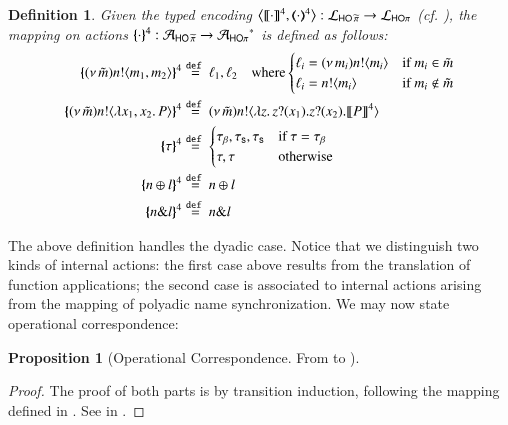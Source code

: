\documentclass[preprint,11pt]{elsarticle}
\newtheorem{definition}{Definition}[section]
\newtheorem{proposition}{Proposition}[section]
\begin{document}
{\begin{definition}
\label{d:actmap4}
Given the typed encoding
	$\big\langle \llbracket\cdot\rrbracket^4, (\!\!\langle\cdot\rangle\!\!)^{4}\big\rangle: \mathcal{L}_{\mathsf{HO}\,{\widetilde{\pi}}} \to \mathcal{L}_{\mathsf{HO}\pi}$ (cf. ), 
	the mapping on actions 
$\{\!\!\{\cdot\}\!\!\}^{4}: \mathcal{A}_{\mathsf{HO}\,{\widetilde{\pi}}} \to  {\mathcal{A}_{\ensuremath{\mathsf{HO}\pi}}}^*$
is defined as follows:
	\begin{align*}
		\mapa{\news{\tilde{m}} \bactout{n}{m_1,  m_2}}^4 
		& \defeq  \ell_1, \ell_2  \quad
		\text{where} 
		\begin{cases}
			\ell_i = \news{m_i}\bactout{n}{m_i} & \text{if $m_i \in \tilde{m}$} 
			\\
			\ell_i = \bactout{n}{m_i} & \text{if $m_i \not\in \tilde{m}$}
		\end{cases}
		\\
		\mapa{\news{\tilde{m}} \bactout{n}{\abs{x_1, x_2}{P}} }^4 
		& \defeq
		 \news{\tilde{m}} \bactout{n}{\abs{z}\binp{z}{x_1} \binp{z}{x_2} \map{P}^{4}} 
		\\
		\mapa{\tau}^{4}  & \defeq 
		\begin{cases}
		\btau, \stau,  \stau & \text{if $\tau = \btau$} 
		\\
		\tau,\tau & \text{otherwise}
		\end{cases}
		\\
		\mapa{\bactsel{n}{l}}^{4}  & \defeq  \bactsel{n}{l} 
				\\
		\mapa{\bactbra{n}{l}}^{4}  & \defeq  \bactbra{n}{l}
	\end{align*}
\end{definition}
\noi The above definition handles the dyadic case. Notice that we distinguish two kinds of internal actions: 
the first case above results from the translation of function applications; the second case 
 is associated to internal actions arising from the mapping of polyadic name synchronization. 
 We may now state operational correspondence:

\begin{proposition}[Operational Correspondence. From \PHOp to \HOp]\myrm
	\label{prop:op_corr_pHOp_to_HOp}

\end{proposition}

\begin{proof}
	The proof of both parts is by transition induction, following 
	the mapping defined in  .
	See 	 in .
\end{proof}	
	
}
\end{document}

